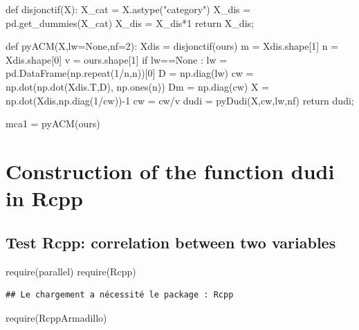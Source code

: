 \documentclass[
  10pt,
]{article}
\newenvironment{Shaded}{\begin{snugshade}}{\end{snugshade}}
\newcommand{\NormalTok}[1]{#1}
\begin{document}
\begin{Shaded}
\begin{Highlighting}[]
\NormalTok{def disjonctif(X):}
\NormalTok{  X\_cat = X.astype("category")}
\NormalTok{  X\_dis = pd.get\_dummies(X\_cat)}
\NormalTok{  X\_dis = X\_dis*1}
\NormalTok{  return X\_dis;}

\NormalTok{def pyACM(X,lw=None,nf=2):}
\NormalTok{  Xdis = disjonctif(ours)}
\NormalTok{  m = Xdis.shape[1]}
\NormalTok{  n = Xdis.shape[0]}
\NormalTok{  v = ours.shape[1]}
\NormalTok{  if lw==None :}
\NormalTok{    lw = pd.DataFrame(np.repeat(1/n,n))[0]}
\NormalTok{  D = np.diag(lw)}
\NormalTok{  cw = np.dot(np.dot(Xdis.T,D), np.ones(n)) }
\NormalTok{  Dm = np.diag(cw)}
\NormalTok{  X = np.dot(Xdis,np.diag(1/cw)){-}1}
\NormalTok{  cw = cw/v}
\NormalTok{  dudi = pyDudi(X,cw,lw,nf)    }
\NormalTok{  return dudi;}
\end{Highlighting}
\end{Shaded}

\begin{Shaded}
\begin{Highlighting}[]
\NormalTok{mca1 = pyACM(ours)}
\end{Highlighting}
\end{Shaded}

\hypertarget{construction-of-the-function-dudi-in-rcpp}{%
\section{Construction of the function dudi in
Rcpp}\label{construction-of-the-function-dudi-in-rcpp}}

\hypertarget{test-rcpp-correlation-between-two-variables}{%
\subsection{Test Rcpp: correlation between two
variables}\label{test-rcpp-correlation-between-two-variables}}

\begin{Shaded}
\begin{Highlighting}[]
\NormalTok{require(parallel)}
\NormalTok{require(Rcpp)}
\end{Highlighting}
\end{Shaded}

\begin{verbatim}
## Le chargement a nécessité le package : Rcpp
\end{verbatim}

\begin{Shaded}
\begin{Highlighting}[]
\NormalTok{require(RcppArmadillo)}
\end{Highlighting}
\end{Shaded}
\end{document}

